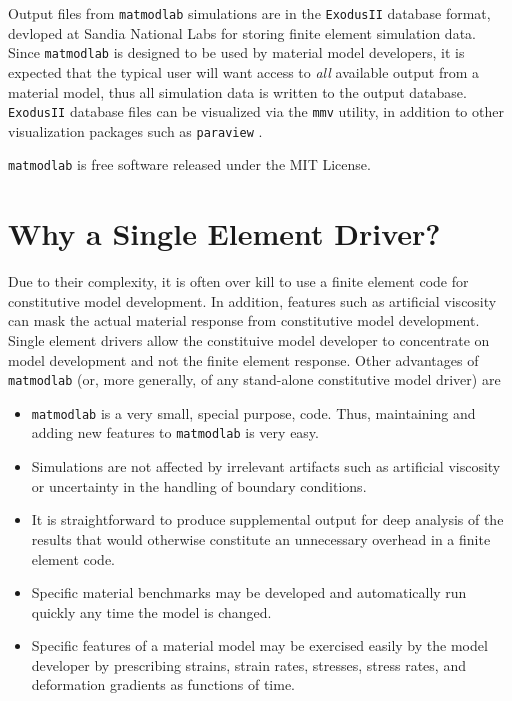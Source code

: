 \documentclass[12pt,report,strict]{SANDreport/SANDreport}
\newcommand{\mml}{\texttt{matmodlab}}
\newcommand{\mmv}{\texttt{mmv}}
\newcommand{\exodusii}{{\sc\texttt{ExodusII}}}
\newcommand{\paraview}[1]{{\sc\texttt{paraview}}}
\begin{document}
Output files from \mml{} simulations are in the \exodusii{} \cite{exodus}
database format, devloped at Sandia National Labs for storing finite element
simulation data. Since \mml{} is designed to be used by material model
developers, it is expected that the typical user will want access to
\emph{all} available output from a material model, thus all simulation
data is written to the output database. \exodusii{} database files can be
visualized via the \mmv{} utility, in addition to other visualization packages
such as \paraview{} \cite{paraview}.

\mml{} is free software released under the MIT License.

\section{Why a Single Element Driver?}
\label{sec:why}
Due to their complexity, it is often over kill to use a finite element code
for constitutive model development. In addition, features such as artificial
viscosity can mask the actual material response from constitutive model
development. Single element drivers allow the constituive model developer to
concentrate on model development and not the finite element response. Other
advantages of \mml{} (or, more generally, of any stand-alone
constitutive model driver) are

\begin{itemize}
  \item \mml{} is a very small, special purpose, code. Thus, maintaining and
  adding new features to \mml{} is very easy.

  \item Simulations are not affected by irrelevant artifacts such as
  artificial viscosity or uncertainty in the handling of boundary conditions.

  \item It is straightforward to produce supplemental output for deep analysis
  of the results that would otherwise constitute an unnecessary overhead in a
  finite element code.

  \item Specific material benchmarks may be developed and automatically run
  quickly any time the model is changed.

  \item Specific features of a material model may be exercised easily by the
  model developer by prescribing strains, strain rates, stresses, stress
  rates, and deformation gradients as functions of time.
\end{itemize}
\end{document}
